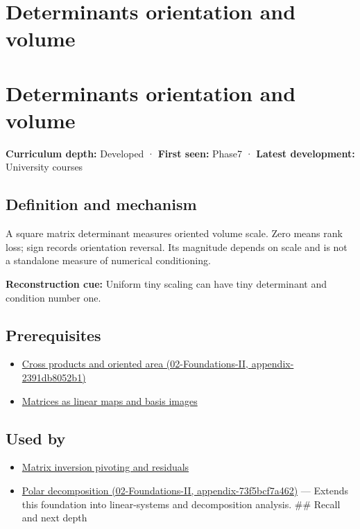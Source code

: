 \hypertarget{appendix-da478be01d02}{}
\section*{Determinants orientation and volume}
\section{Determinants orientation and volume}\label{appendix-da478be01d02-determinants-orientation-and-volume}

\textbf{Curriculum depth:} Developed · \textbf{First seen:} Phase7 · \textbf{Latest development:} University courses

\subsection{Definition and mechanism}\label{appendix-da478be01d02-definition-and-mechanism}

A square matrix determinant measures oriented volume scale. Zero means rank loss; sign records orientation reversal. Its magnitude depends on scale and is not a standalone measure of numerical conditioning.

\textbf{Reconstruction cue:} Uniform tiny scaling can have tiny determinant and condition number one.

\subsection{Prerequisites}\label{appendix-da478be01d02-prerequisites}

\begin{itemize}
\tightlist
\item
  \href{../02-Foundations-II/main.pdf\#nameddest=appendix-2391db8052b1}{Cross products and oriented area (02-Foundations-II, appendix-2391db8052b1)}
\item
  \hyperref[appendix-bd39c3bf5d64]{Matrices as linear maps and basis images}
\end{itemize}

\subsection{Used by}\label{appendix-da478be01d02-used-by}

\begin{itemize}
\tightlist
\item
  \hyperref[appendix-48d2e66378ab]{Matrix inversion pivoting and residuals}
\item
  \href{../02-Foundations-II/main.pdf\#nameddest=appendix-73f5bcf7a462}{Polar decomposition (02-Foundations-II, appendix-73f5bcf7a462)} --- Extends this foundation into linear-systems and decomposition analysis. \#\# Recall and next depth
\end{itemize}

